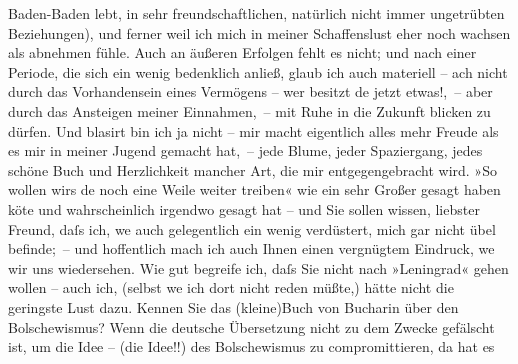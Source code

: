\begin{ledgroupsized}[t]{13cm}
                  Baden-Baden lebt, in sehr freundschaftlichen,
               natürlich nicht immer unge{\pb}trübten Beziehungen),
               und ferner weil ich mich in meiner Schaffenslust eher noch wachsen als abnehmen
               fühle. Auch an äußeren Erfolgen fehlt es nicht; und nach einer Periode, die sich ein
               wenig bedenklich anließ, glaub ich auch materiell – ach nicht durch das Vorhandensein
               eines Vermögens – wer besitzt de{\geminationn} jetzt etwas!, – aber
               durch das Ansteigen meiner Einnahmen, – mit Ruhe in die Zukunft blicken zu dürfen.
               Und blasirt bin ich ja nicht – mir macht eigentlich alles mehr Freude als es mir in
               meiner Jugend gemacht hat, – jede Blume, jeder Spaziergang, jedes schöne Buch und
               Herzlichkeit mancher Art, die mir entgegengebracht wird. »So wollen wirs de{\geminationn} noch eine Weile weiter treiben« wie ein sehr Großer
               gesagt haben kö{\geminationn}te und wahrscheinlich irgendwo gesagt
               hat – und Sie sollen wissen, liebster Freund, daſs ich, we{\geminationn} auch gelegentlich ein wenig verdüstert, {\pb}mich gar nicht übel befinde; – und hoffentlich
               mach ich auch Ihnen einen vergnügtem Eindruck, we{\geminationn} wir
               uns wiedersehen.\pend
           \pstart
           Wie gut begreife ich, daſs Sie nicht nach »Leningrad« gehen wollen – auch ich, (selbst we{\geminationn}
               ich dort nicht reden müßte,) hätte nicht die geringste Lust dazu. Kennen Sie das \introOben{}(kleine)\introOben{}{ }Buch von Bucharin über den Bolschewismus? Wenn die deutsche Übersetzung
               nicht \label{T_L02444_2v}\label{T_L02444_2h} zu dem Zwecke gefälscht ist, um die Idee – (die
               Idee!!) des Bolschewismus zu compromittieren, da{\geminationn} hat es

\end{ledgroupsized}
